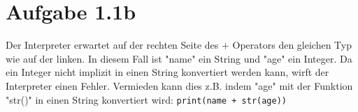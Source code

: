 \documentclass{article}
\begin{document}
    \section*{Aufgabe 1.1b}
    Der Interpreter erwartet auf der rechten Seite des $+$ Operators den gleichen Typ wie auf der linken.
    In diesem Fall ist "name" ein String und "age" ein Integer.
    Da ein Integer nicht implizit in einen String konvertiert werden kann, wirft der Interpreter einen Fehler.
    Vermieden kann dies z.B. indem "age" mit der Funktion "str()" in einen String konvertiert wird:
    \verb-print(name + str(age))-
\end{document}
